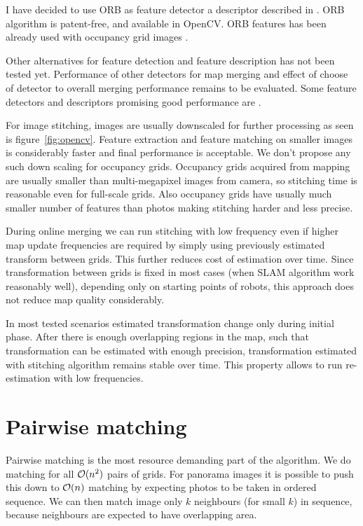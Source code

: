 I have decided to use ORB as feature detector a descriptor described in \cite{Rublee2011}. ORB algorithm is patent-free, and available in OpenCV. ORB features has been already used with occupancy grid images \cite{MapstitchROS} \cite{Andre2014}.

Other alternatives for feature detection and feature description has not been tested yet. Performance of other detectors for map merging and effect of choose of detector to overall merging performance remains to be evaluated. Some feature detectors and descriptors promising good performance are \cite{Alahi2012} \cite{alcantarilla2011fast} \cite{calonder2010brief}.

For image stitching, images are usually downscaled for further processing as seen is figure~\ref{fig:opencv}. Feature extraction and feature matching on smaller images is considerably faster and final performance is acceptable. We don't propose any such down scaling for occupancy grids. Occupancy grids acquired from mapping are usually smaller than multi-megapixel images from camera, so stitching time is reasonable even for full-scale grids. Also occupancy grids have usually much smaller number of features than photos making stitching harder and less precise.

During online merging we can run stitching with low frequency even if higher map update frequencies are required by simply using previously estimated transform between grids. This further reduces cost of estimation over time. Since transformation between grids is fixed in most cases (when SLAM algorithm work reasonably well), depending only on starting points of robots, this approach does not reduce map quality considerably.

In most tested scenarios estimated transformation change only during initial phase. After there is enough overlapping regions in the map, such that transformation can be estimated with enough precision, transformation estimated with stitching algorithm remains stable over time. This property allows to run re-estimation with low frequencies.


\section{Pairwise matching} %
\label{sec:pairwise_matching}

Pairwise matching is the most resource demanding part of the algorithm. We do matching for all $\operatorname{\mathcal{O}}(n^2)$ pairs of grids. For panorama images it is possible to push this down to $\operatorname{\mathcal{O}}(n)$ matching by expecting photos to be taken in ordered sequence. We can then match image only $k$ neighbours (for small $k$) in sequence, because neighbours are expected to have overlapping area.

